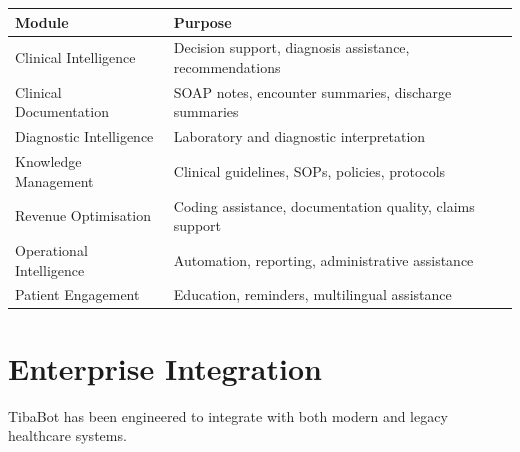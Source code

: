 \begin{center}

\begin{tabularx}{\textwidth}{|Y|Y|}
\hline


\textbf{Module} &
\textbf{Purpose} \\

\hline

Clinical Intelligence &
Decision support, diagnosis assistance, recommendations \\

\hline

Clinical Documentation &
SOAP notes, encounter summaries, discharge summaries \\

\hline

Diagnostic Intelligence &
Laboratory and diagnostic interpretation \\

\hline

Knowledge Management &
Clinical guidelines, SOPs, policies, protocols \\

\hline

Revenue Optimisation &
Coding assistance, documentation quality, claims support \\

\hline

Operational Intelligence &
Automation, reporting, administrative assistance \\

\hline

Patient Engagement &
Education, reminders, multilingual assistance \\

\hline

\end{tabularx}

\end{center}


\section{Enterprise Integration}

TibaBot has been engineered to integrate with both modern and legacy healthcare systems.

\vspace{5mm}

